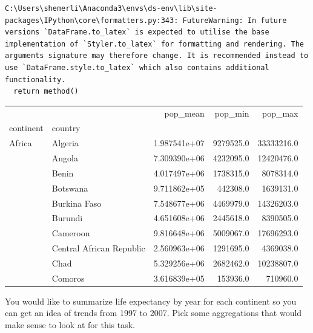 \documentclass[
  letterpaper,
  DIV=11,
  numbers=noendperiod]{scrreprt}
\begin{document}
\begin{verbatim}
C:\Users\shemerli\Anaconda3\envs\ds-env\lib\site-packages\IPython\core\formatters.py:343: FutureWarning: In future versions `DataFrame.to_latex` is expected to utilise the base implementation of `Styler.to_latex` for formatting and rendering. The arguments signature may therefore change. It is recommended instead to use `DataFrame.style.to_latex` which also contains additional functionality.
  return method()
\end{verbatim}

\begin{tabular}{llrrr}
\toprule
       &         &      pop\_mean &    pop\_min &     pop\_max \\
continent & country &               &            &             \\
\midrule
Africa & Algeria &  1.987541e+07 &  9279525.0 &  33333216.0 \\
       & Angola &  7.309390e+06 &  4232095.0 &  12420476.0 \\
       & Benin &  4.017497e+06 &  1738315.0 &   8078314.0 \\
       & Botswana &  9.711862e+05 &   442308.0 &   1639131.0 \\
       & Burkina Faso &  7.548677e+06 &  4469979.0 &  14326203.0 \\
       & Burundi &  4.651608e+06 &  2445618.0 &   8390505.0 \\
       & Cameroon &  9.816648e+06 &  5009067.0 &  17696293.0 \\
       & Central African Republic &  2.560963e+06 &  1291695.0 &   4369038.0 \\
       & Chad &  5.329256e+06 &  2682462.0 &  10238807.0 \\
       & Comoros &  3.616839e+05 &   153936.0 &    710960.0 \\
\bottomrule
\end{tabular}

\begin{tcolorbox}[enhanced jigsaw, colframe=quarto-callout-warning-color-frame, toprule=.15mm, colback=white, leftrule=.75mm, rightrule=.15mm, breakable, colbacktitle=quarto-callout-warning-color!10!white, arc=.35mm, bottomtitle=1mm, bottomrule=.15mm, titlerule=0mm, title={Challenge 4}, toptitle=1mm, left=2mm, opacityback=0, coltitle=black, opacitybacktitle=0.6]
You would like to summarize life expectancy by year for each continent
so you can get an idea of trends from 1997 to 2007. Pick some
aggregations that would make sense to look at for this task.
\end{tcolorbox}
\end{document}
